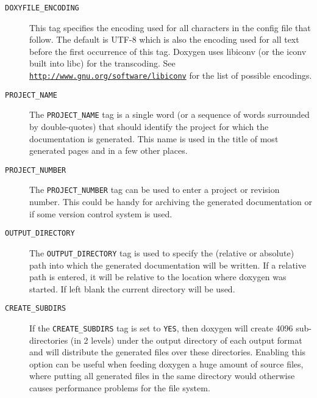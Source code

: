  \begin{description}
\item[{\tt DOXYFILE\_\-ENCODING} ] This tag specifies the encoding used for all characters in the config file that follow. The default is UTF-8 which is also the encoding used for all text before the first occurrence of this tag. Doxygen uses libiconv (or the iconv built into libc) for the transcoding. See \href{http://www.gnu.org/software/libiconv}{\tt http://www.gnu.org/software/libiconv} for the list of possible encodings.

\label{config_cfg_project_name}
\hypertarget{config_cfg_project_name}{}
 \item[{\tt PROJECT\_\-NAME} ] The {\tt PROJECT\_\-NAME} tag is a single word (or a sequence of words surrounded by double-quotes) that should identify the project for which the documentation is generated. This name is used in the title of most generated pages and in a few other places.

\label{config_cfg_project_number}
\hypertarget{config_cfg_project_number}{}
 \item[{\tt PROJECT\_\-NUMBER} ] The {\tt PROJECT\_\-NUMBER} tag can be used to enter a project or revision number. This could be handy for archiving the generated documentation or if some version control system is used.

\label{config_cfg_output_directory}
\hypertarget{config_cfg_output_directory}{}
 \item[{\tt OUTPUT\_\-DIRECTORY} ] The {\tt OUTPUT\_\-DIRECTORY} tag is used to specify the (relative or absolute) path into which the generated documentation will be written. If a relative path is entered, it will be relative to the location where doxygen was started. If left blank the current directory will be used.

\label{config_cfg_create_subdirs}
\hypertarget{config_cfg_create_subdirs}{}
 \item[{\tt CREATE\_\-SUBDIRS} ] If the {\tt CREATE\_\-SUBDIRS} tag is set to {\tt YES}, then doxygen will create 4096 sub-directories (in 2 levels) under the output directory of each output format and will distribute the generated files over these directories. Enabling this option can be useful when feeding doxygen a huge amount of source files, where putting all generated files in the same directory would otherwise causes performance problems for the file system.


\end{description}

